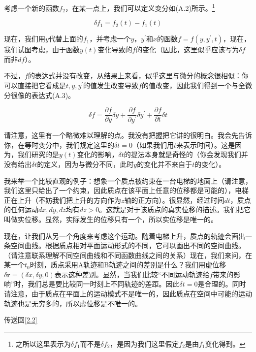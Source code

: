 \documentclass[a4paper, 10pt, openany]{book}%
\begin{document}
考虑一个新的函数$f_2$，在某一点上，我们可以定义变分如(A.2)所示。\footnote{之所以这里表示为$\delta f_1$而不是$\delta f_2$，是因为我们这里假定$f_2$是由$f_1$变化得到。}

\begin{equation}
  \delta f_1=f_2(t)-f_1(t)
\end{equation}



现在，我们用$y$代替上面的$f_1$，并考虑一个$y$，$y^\prime$和$x$的函数$f=f(y,y^\prime,t)$，现在，我们试图考虑，由于函数$y(t)$变化导致的$f$的变化（因此，这里似乎应该写为$\delta f$而非$df$）。

不过，$f$的表达式并没有改变，从结果上来看，似乎这里与微分的概念很相似：你可以直接把它看成是$t,y,y^\prime$的值发生改变导致$f$的值改变，因此我们得到一个与全微分很像的表达式(A.3)。

\begin{equation}
  \delta f=\frac{\partial f}{\partial y}\delta y+\frac{\partial f}{\partial y^\prime}\delta y^\prime+\frac{\partial f}{\partial t}\delta t
\end{equation}

请注意，这里有一个略微难以理解的点。我没有把握把它讲的很明白。我会先告诉你，在等时变分中，我们规定这里的$\delta t=0$（如果我们用$t$来表示时间）。这是因为，我们研究的是$y(t)$变化的影响，$\delta t$的提法本身就是奇怪的（你会发现我们并没有给出$\delta t$的定义，因为与微分不同，此时$y$的变化并不来自于$t$的变化）。

我来举一个比较直观的例子：想象一个质点被约束在一台电梯的地面上（请注意，我们这里只给出了一个约束，因此质点在该平面上任意的位移都是可能的），电梯正在上升（不妨我们把上升的方向作为$z$轴的正方向）。很显然，经过时间$dt$，质点的任何运动$dx,dy,dz$均有$dz>0$。这就是对于该质点的真实位移的描述。我们把它叫做实位移。显然，实际发生的位移只有一个，所以实位移是唯一的。

现在，让我们从另一个角度来考虑这个运动。随着电梯上升，质点的轨迹会画出一条空间曲线。根据质点相对平面运动形式的不同，它可以画出不同的空间曲线。（请注意联系理解不同空间曲线和不同函数曲线之间的关系）现在，我们来问，在某一个$t_0$时刻，质点采用A轨迹和B轨迹之间的差别是什么？我们用虚位移$\delta \textbf{r}=(\delta x,\delta y,0)$表示这种差别。显然，当我们比较“不同运动轨迹给$f$带来的影响”时，我们总是要比较同一时刻上不同轨迹的差距。因此$\delta t=0$是合理的。同时请注意，由于质点在平面上的运动模式不是唯一的，因此质点在空间中可能的运动轨迹也是无穷多的，所以虚位移是不唯一的。

传送回\ref{2.2}
\end{document}

